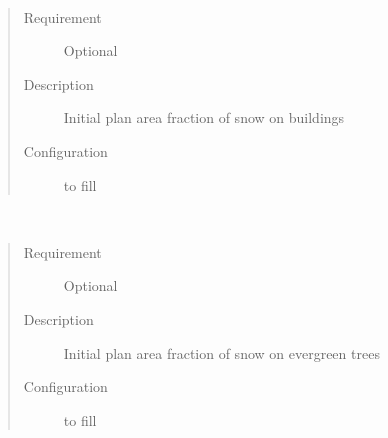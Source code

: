 \documentclass[letterpaper,10pt,english]{sphinxmanual}
\begin{document}

\begin{fulllineitems}
\label{\detokenize{input_files/Initial_Conditions/Snow_related_parameters:cmdoption-arg-snowfracbldgs}}~\begin{quote}\begin{description}
\item[{Requirement}] \leavevmode
Optional

\item[{Description}] \leavevmode
Initial plan area fraction of snow on buildings

\item[{Configuration}] \leavevmode
to fill

\end{description}\end{quote}

\end{fulllineitems}


\begin{fulllineitems}
\label{\detokenize{input_files/Initial_Conditions/Snow_related_parameters:cmdoption-arg-snowfracevetr}}~\begin{quote}\begin{description}
\item[{Requirement}] \leavevmode
Optional

\item[{Description}] \leavevmode
Initial plan area fraction of snow on evergreen trees

\item[{Configuration}] \leavevmode
to fill

\end{description}\end{quote}

\end{fulllineitems}

\end{document}
